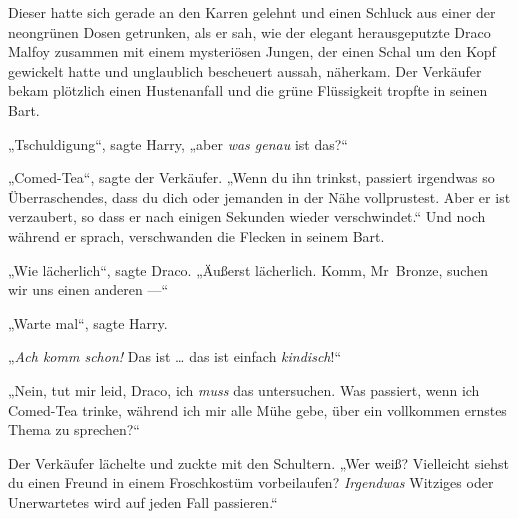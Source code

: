 Dieser hatte sich gerade an den Karren gelehnt und einen Schluck aus einer der neongrünen Dosen getrunken, als er sah, wie der elegant herausgeputzte Draco Malfoy zusammen mit einem mysteriösen Jungen, der einen Schal um den Kopf gewickelt hatte und unglaublich bescheuert aussah, näherkam. Der Verkäufer bekam plötzlich einen Hustenanfall und die grüne Flüssigkeit tropfte in seinen Bart.

„Tschuldigung“, sagte Harry, „aber \emph{was genau} ist das?“

„Comed-Tea“, sagte der Verkäufer.
„Wenn du ihn trinkst, passiert irgendwas so Überraschendes, dass du dich oder jemanden in der Nähe vollprustest. Aber er ist verzaubert, so dass er nach einigen Sekunden wieder verschwindet.“ Und noch während er sprach, verschwanden die Flecken in seinem Bart.

„Wie lächerlich“, sagte Draco. „Äußerst lächerlich. Komm, Mr~Bronze, suchen wir uns einen anderen —“

„Warte mal“, sagte Harry.

„\emph{Ach komm schon!} Das ist … das ist einfach \emph{kindisch}!“

„Nein, tut mir leid, Draco, ich \emph{muss} das untersuchen. Was passiert, wenn ich Comed-Tea trinke, während ich mir alle Mühe gebe, über ein vollkommen ernstes Thema zu sprechen?“

Der Verkäufer lächelte und zuckte mit den Schultern.
„Wer weiß? Vielleicht siehst du einen Freund in einem Froschkostüm vorbeilaufen? \emph{Irgendwas} Witziges oder Unerwartetes wird auf jeden Fall passieren.“

